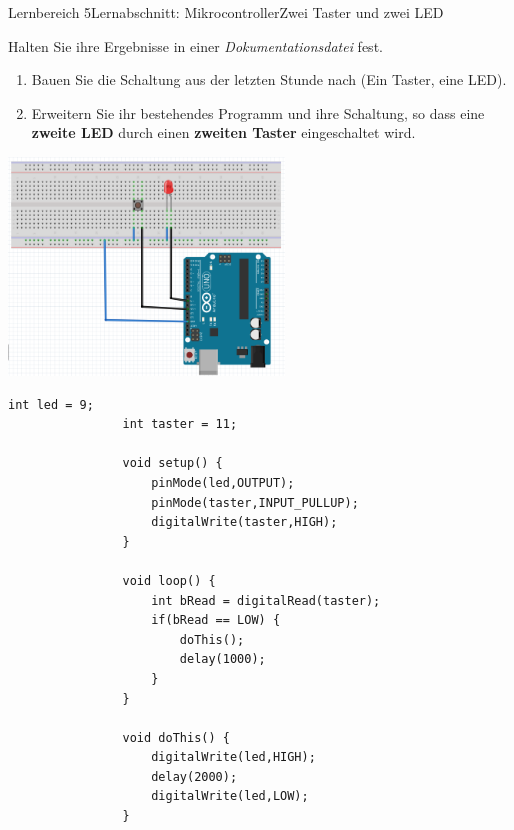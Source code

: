 \documentclass[oneside,openany,headings=optiontotoc,11pt,numbers=noenddot]{scrreprt}
\begin{document}
		\begin{worksheet}{Lernbereich 5}{Lernabschnitt: Mikrocontroller}{Zwei Taster und zwei LED}
			\begin{framed}
				\noindent
				Halten Sie ihre Ergebnisse in einer \textit{Dokumentationsdatei} fest.
				\begin{enumerate}[series=tsk]
					\item[] Bauen Sie die Schaltung aus der letzten Stunde nach (Ein Taster, eine LED).
					\item Erweitern Sie ihr bestehendes Programm und ihre Schaltung, so dass eine \textbf{zweite LED} durch einen \textbf{zweiten Taster} eingeschaltet wird.
				\end{enumerate}
				\includegraphics[width=0.55\textwidth]{../99_Bilder/20191205_1.png}
			\end{framed}
			\begin{lstlisting}[style=Arduino]
				int led = 9;
				int taster = 11;
				
				void setup() {
					pinMode(led,OUTPUT);
					pinMode(taster,INPUT_PULLUP);
					digitalWrite(taster,HIGH);
				}
				
				void loop() {
					int bRead = digitalRead(taster);
					if(bRead == LOW) {
						doThis();
						delay(1000);
					}
				}
				
				void doThis() {
					digitalWrite(led,HIGH);
					delay(2000);
					digitalWrite(led,LOW);
				}
			\end{lstlisting}
		\end{worksheet}
\end{document}
